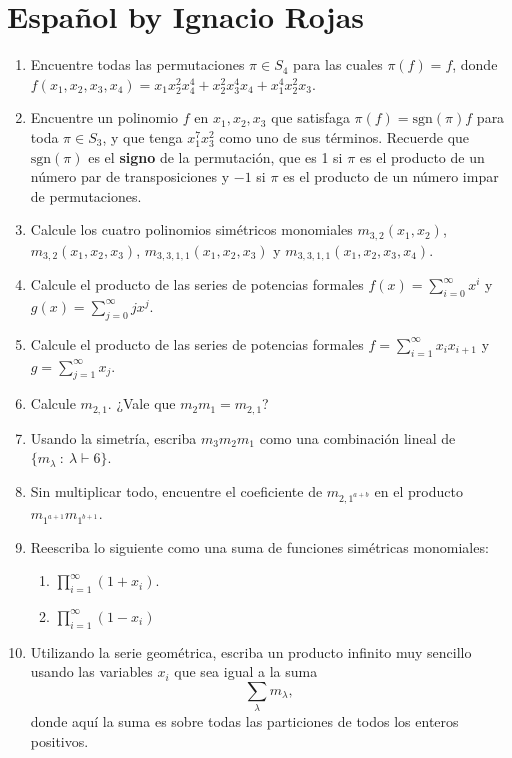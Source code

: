 \documentclass{article}
\begin{document}
\section*{Español by Ignacio Rojas}
\begin{enumerate}
\item Encuentre todas las permutaciones $\pi\in S_4$ para las cuales $\pi(f) = f$, donde $f(x_1, x_2, x_3,x_4) = x_1x_2^2x_4^4 + x_2^2x_3^4x_4+x_1^4x_2^2x_3$.
\item Encuentre un polinomio $f$ en $x_1, x_2, x_3$ que satisfaga $\pi(f) = \text{sgn}(\pi) f$ para toda $\pi\in S_3$, y que tenga $x_1^7x_3^2$ como uno de sus términos. Recuerde que $\text{sgn}(\pi)$ es el {\bf signo} de la permutación, que es 1 si $\pi$ es el producto de un número par de transposiciones y $-1$ si $\pi$ es el producto de un número impar de permutaciones.
\item Calcule los cuatro polinomios simétricos monomiales $m_{3,2}(x_1,x_2)$, $m_{3,2}(x_1,x_2,x_3)$, $m_{3,3,1,1}(x_1,x_2,x_3)$ y $m_{3,3,1,1}(x_1,x_2,x_3,x_4)$.
\item Calcule el producto de las series de potencias formales $f(x) = \sum_{i = 0} ^\infty x^i$ y $g(x) = \sum_{j=0}^\infty jx^j$.
\item Calcule el producto de las series de potencias formales $f= \sum_{i=1}^\infty x_ix_{i+1}$ y $g=\sum_{j=1}^\infty x_j$.
\item Calcule $m_{2,1}$. ¿Vale que $m_2m_1 = m_{2,1}$?
\item Usando la simetría, escriba $m_3m_2m_1$ como una combinación lineal de $\{m_\lambda\ : \ \lambda \vdash 6\}$.
\item Sin multiplicar todo, encuentre el coeficiente de $m_{2,1^{a+b}}$ en el producto $m_{1^{a+1}}m_{1^{b+1}}$.
\item Reescriba lo siguiente como una suma de funciones simétricas monomiales:
\begin{enumerate}
\item $\prod_{i=1}^\infty (1+x_i)$.
\item $\prod_{i=1}^\infty (1-x_i)$
\end{enumerate}
\item Utilizando la serie geométrica, escriba un producto infinito muy sencillo usando las variables $x_i$ que sea igual a la suma
\[ \sum_\lambda m_\lambda,\, \]
donde aquí la suma es sobre todas las particiones de todos los enteros positivos.
\end{enumerate}
\end{document}
